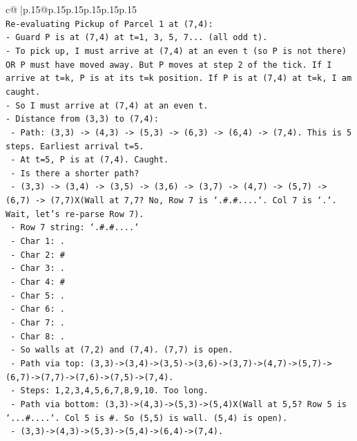 \documentclass{article}
\begin{document}
{\begin{supertabular}{c@{$\;$}|p{.15\linewidth}@{}p{.15\linewidth}p{.15\linewidth}p{.15\linewidth}p{.15\linewidth}p{.15\linewidth}}
{{{\\ 
\texttt{Re{-}evaluating Pickup of Parcel 1 at (7,4):} \\
\texttt{{-} Guard P is at (7,4) at t=1, 3, 5, 7... (all odd t).} \\
\texttt{{-} To pick up, I must arrive at (7,4) at an even t (so P is not there) OR P must have moved away. But P moves at step 2 of the tick. If I arrive at t=k, P is at its t=k position. If P is at (7,4) at t=k, I am caught.} \\
\texttt{{-} So I must arrive at (7,4) at an even t.} \\
\texttt{{-} Distance from (3,3) to (7,4):} \\
\texttt{  {-} Path: (3,3) {-}> (4,3) {-}> (5,3) {-}> (6,3) {-}> (6,4) {-}> (7,4). This is 5 steps. Earliest arrival t=5.} \\
\texttt{  {-} At t=5, P is at (7,4). Caught.} \\
\texttt{  {-} Is there a shorter path?} \\
\texttt{  {-} (3,3) {-}> (3,4) {-}> (3,5) {-}> (3,6) {-}> (3,7) {-}> (4,7) {-}> (5,7) {-}> (6,7) {-}> (7,7)X(Wall at 7,7? No, Row 7 is `.\#.\#....`. Col 7 is `.`. Wait, let's re{-}parse Row 7).} \\
\texttt{  {-} Row 7 string: `.\#.\#....`} \\
\texttt{    {-} Char 1: .} \\
\texttt{    {-} Char 2: \#} \\
\texttt{    {-} Char 3: .} \\
\texttt{    {-} Char 4: \#} \\
\texttt{    {-} Char 5: .} \\
\texttt{    {-} Char 6: .} \\
\texttt{    {-} Char 7: .} \\
\texttt{    {-} Char 8: .} \\
\texttt{    {-} So walls at (7,2) and (7,4). (7,7) is open.} \\
\texttt{  {-} Path via top: (3,3){-}>(3,4){-}>(3,5){-}>(3,6){-}>(3,7){-}>(4,7){-}>(5,7){-}>(6,7){-}>(7,7){-}>(7,6){-}>(7,5){-}>(7,4).} \\
\texttt{    {-} Steps: 1,2,3,4,5,6,7,8,9,10. Too long.} \\
\texttt{  {-} Path via bottom: (3,3){-}>(4,3){-}>(5,3){-}>(5,4)X(Wall at 5,5? Row 5 is `...\#....`. Col 5 is \#. So (5,5) is wall. (5,4) is open).} \\
\texttt{    {-} (3,3){-}>(4,3){-}>(5,3){-}>(5,4){-}>(6,4){-}>(7,4).} \\
}}}
\end{supertabular}}
\end{document}
